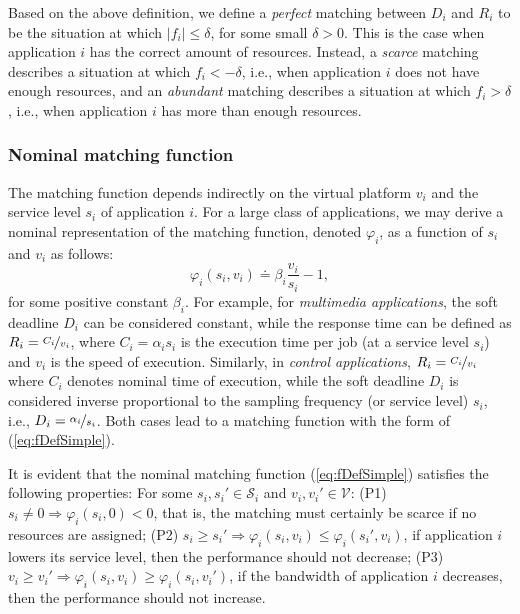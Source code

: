 \documentclass[letter,11pt]{article}
\begin{document}
Based on the above definition, we define a \textit{perfect} matching between $D_i$ and $R_i$ to be the situation at which $|f_i|\leq\delta$, for some small $\delta>0$. This is the case when application $i$ has the correct amount of resources. Instead, a \textit{scarce} matching describes a situation at which $f_i < -\delta$, i.e., when application $i$ does not have enough resources, and an \textit{abundant} matching describes a situation at which $f_i > \delta$, i.e., when application $i$ has more than enough resources.

\subsubsection{Nominal matching function}

The matching function depends indirectly on the virtual platform $v_i$ and the service level $s_i$ of application $i$. For a large class of applications, we may derive a nominal representation of the matching function, denoted $\varphi_i$, as a function of $s_i$ and $v_i$ as follows:
\begin{equation}
  \varphi_i(s_i,v_i) {\doteq} \beta_i\frac{v_i}{s_i}-1,
  \label{eq:fDefSimple}
\end{equation}
for some positive constant $\beta_i$. For example, for \textit{multimedia applications}, the soft deadline $D_i$ can be considered constant, while the response time can be defined as $R_i=\nicefrac{C_i}{v_i}$, where $C_i=\alpha_is_i$ is the execution time per job (at a service level $s_i$) and $v_i$ is the speed of execution.  Similarly, in \textit{control applications}, $R_i=\nicefrac{C_i}{v_i}$ where $C_i$ denotes nominal time of execution, while the soft deadline $D_i$ is considered inverse proportional to the sampling frequency (or service level) $s_i$, i.e.,
$D_i=\nicefrac{\alpha_i}{s_i}$. Both cases lead to a matching function with the form of (\ref{eq:fDefSimple}).

It is evident that the nominal matching function (\ref{eq:fDefSimple}) satisfies the following properties: For some
$s_i,s_i'\in\mathcal{S}_i$ and $v_i,v_i'\in{\mathcal{V}}$: (P1) $s_i\neq 0 \Rightarrow \varphi_i(s_i,0) < 0$, that is, the
matching must certainly be scarce if no resources are assigned; (P2) $s_i \geq s_i'\Rightarrow \varphi_i(s_i,v_i) \leq \varphi_i(s_i',v_i)$, if application $i$ lowers its service level, then the performance should not decrease; (P3) $v_i \geq v_i'\Rightarrow \varphi_i(s_i,v_i) \geq \varphi_i(s_i,v_i')$, if the bandwidth of application $i$ decreases, then the performance should not increase.
\end{document}
